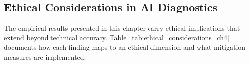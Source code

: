 
\subsection{Ethical Considerations in AI Diagnostics}

The empirical results presented in this chapter carry ethical implications that extend beyond technical accuracy. Table~\ref{tab:ethical_considerations_ch4} documents how each finding maps to an ethical dimension and what mitigation measures are implemented.

\iffalse %
